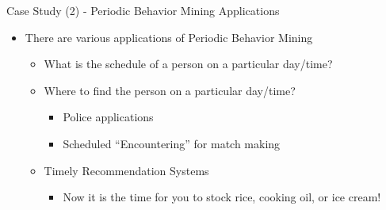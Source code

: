 \documentclass[
 size=14pt,
 paper=smartboard,  %
 mode=present, 		%
 display=slides, 	%
 pauseslide,
 fleqn,leqno]{powerdot}{}
\begin{document}
\begin{slide}[toc=,bm=]{Case Study (2) - Periodic Behavior Mining Applications}

\begin{itemize}
\item
There are various applications of Periodic Behavior Mining

    \begin{itemize}
    \item
    What is the schedule of a person on a particular day/time?

    \item
    Where to find the person on a particular day/time?
        \begin{itemize}
        \item
        Police applications

        \item
        Scheduled ``Encountering'' for match making
        \end{itemize}
    \item
    Timely Recommendation Systems
        \begin{itemize}
        \item
        Now it is the time for you to stock rice, cooking oil, or ice cream!
        \end{itemize}

\end{itemize}
\end{itemize}

\end{slide}
\end{document}
